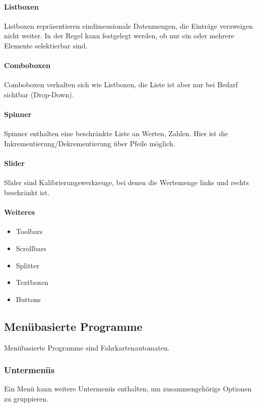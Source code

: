 				\paragraph{Listboxen}
					Listboxen repräsentieren eindimensionale Datenmengen, \dh die Einträge verzweigen nicht weiter. In der Regel kann festgelegt werden, ob nur ein oder mehrere Elemente selektierbar sind.

				\paragraph{Comboboxen}
					Comboboxen verhalten sich wie Listboxen, die Liste ist aber nur bei Bedarf sichtbar (Drop-Down).

				\paragraph{Spinner}
					Spinner enthalten eine beschränkte Liste an Werten, \zB Zahlen. Hier ist die Inkrementierung/Dekrementierung über Pfeile möglich.

				\paragraph{Slider}
					Slider sind Kalibrierungswerkzeuge, bei denen die Wertemenge links und rechts beschränkt ist.

				\paragraph{Weiteres}
					\begin{itemize}
						\item Toolbars
						\item Scrollbars
						\item Splitter
						\item Textboxen
						\item Buttons
					\end{itemize}

		\subsection{Menübasierte Programme}
			Menübasierte Programme sind \zB Fahrkartenautomaten.

			\subsubsection{Untermenüs}
				Ein Menü kann weitere Untermenüs enthalten, um zusammengehörige Optionen zu gruppieren.

